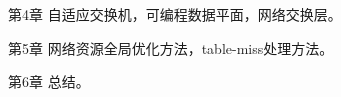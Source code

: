第4章 自适应交换机，可编程数据平面，网络交换层。

第5章 网络资源全局优化方法，table-miss处理方法。

第6章 总结。









































